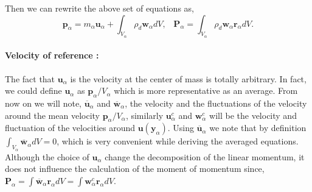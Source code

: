 Then we can rewrite the above set of equations as, 
\begin{equation}
    \bm{p}_\alpha = m_\alpha \bm{u}_\alpha 
    + \int_{V_\alpha} \rho_d \bm{w}_\alpha dV,\;\;\;
    \bm{P}_\alpha = \int_{V_\alpha} \rho_d \bm{w}_\alpha\bm{r}_\alpha dV.
    \label{eq:decomposition}
\end{equation}
\paragraph*{Velocity of reference :}
The fact that $\bm{u}_\alpha$ is the velocity at the center of mass is totally arbitrary.
In fact, we could define $\bm{u}_\alpha$ as $\bm{p}_\alpha / V_\alpha$ which is more representative 
as an average. 
From now on we will note, $\bm{\overline{u}}_\alpha$ and $\bm{\overline{w}}_\alpha$, the velocity and the fluctuations of 
the velocity around the mean velocity $\bm{p}_\alpha/V_\alpha$, similarly 
$\bm{u}^c_\alpha$ and $\bm{w}^c_\alpha$ will be the velocity and fluctuation of the velocities around 
$\bm{u}(\bm{y}_\alpha)$.
Using $\bm{\overline{u}}_\alpha$ we note that by definition 
$\int_{V_\alpha} \bm{\overline{w}}_\alpha dV = 0$, which is very convenient while deriving the averaged equations. 
Although the choice of $\bm{u}_\alpha$ change the decomposition of the linear momentum,
it does not influence the calculation of the moment of momentum since,
$\bm{P}_\alpha = \int \bm{\overline{w}}_\alpha\bm{r}_\alpha dV = \int \bm{w}^c_\alpha\bm{r}_\alpha dV$.

